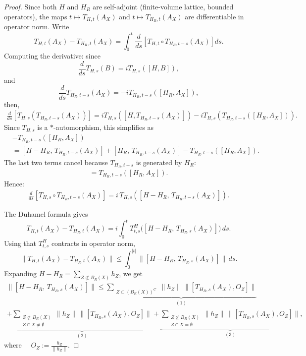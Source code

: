 \documentclass[11pt]{article}
\numberwithin{equation}{section}
\numberwithin{figure}{section}
\numberwithin{table}{section}
\theoremstyle{definition}
\theoremstyle{plain}
\theoremstyle{remark}
\newcommand{\Z}{\mathbb{Z}}
\newcommand{\summ}[1]{\sum\limits_{\substack{ #1 }}}
\begin{document}
\begin{proof}
Since both $H$ and $H_R$ are self-adjoint (finite-volume lattice, bounded operators), the maps $t\mapsto T_{H,t}(A_X)$ and $t\mapsto T_{H_R,t}(A_X)$ are differentiable in operator norm. Write
\[
T_{H,t}(A_X)-T_{H_R,t}(A_X)=\int_0^t \dfrac{d}{ds}\left [ T_{H,t}\circ T_{H_R,t-s}(A_X)\right ]ds.
\]
Computing the derivative: since \[\frac{d}{ds}T_{H,s}(B) = iT_{H,s}([H,B]),\] and
\[\frac{d}{ds}T_{H_R,t-s}(A_X) = -iT_{H_R,t-s}([H_R, A_X]),\]then,
\begin{align}
\frac{d}{ds}\left[T_{H,s}\!\left(T_{H_R,t-s}(A_X)\right)\right]
= iT_{H,s}\!\left([H,T_{H_R,t-s}(A_X)]\right)
- iT_{H,s}\!\left(T_{H_R,t-s}([H_R, A_X])\right).
\end{align}
Since $T_{H,s}$ is a $*$-automorphism, this simplifies as
\begin{align*}
[H,T_{H_R,t-s}(A_X)] &- T_{H_R,t-s}([H_R,A_X])\\
&= [H - H_R,\, T_{H_R,t-s}(A_X)]
+ [H_R,\, T_{H_R,t-s}(A_X)]
- T_{H_R,t-s}([H_R, A_X]).
\end{align*}
The last two terms cancel because $T_{H_R,t-s}$ is generated by $H_R$:
\begin{align}
[H_R,\, T_{H_R,t-s}(A_X)] = T_{H_R,t-s}([H_R, A_X]).
\end{align}
Hence:
\begin{align}
\frac{d}{ds}\left[T_{H,s} \circ T_{H_R,t-s}(A_X)\right]
= i\,T_{H,s}\!\left([H - H_R,\, T_{H_R,t-s}(A_X)]\right).
\end{align}

The Duhamel formula gives
\begin{equation}
T_{H,t}(A_X)-T_{H_R,t}(A_X)
= i\int_0^{t} T_{t,s}^{H}\!\big([H-H_R,\,T_{H_R,s}(A_X)]\big)\,ds.
\end{equation}
Using that $T_{t,s}^H$ contracts in operator norm,
\begin{equation}
\big\|T_{H,t}(A_X)-T_{H_R,t}(A_X)\big\|
\le \int_0^{|t|}\!\big\|[H-H_R,\,T_{H_R,s}(A_X)]\big\|\,ds.
\label{eq:duhamel}
\end{equation}
Expanding $H-H_R=\sum_{Z\not\subset B_R(X)} h_Z$, we get
\begin{multline}
\big\|[H-H_R,\,T_{H_R,s}(A_X)]\big\|
\le \underbrace{\summ{Z\subset (B_R(X))^C } \|h_Z\|\,
\big\|[T_{H_R,s}(A_X), O_Z]\big\|}_{(1)} \\
+\underbrace{\summ{Z\not\subset B_R(X)\\Z\cap X \neq \emptyset} \|h_Z\|\,
\big\|[T_{H_R,s}(A_X), O_Z]\big\|}_{(2)}
+\underbrace{\summ{Z\not\subset B_R(X)\\Z\cap X = \emptyset} \|h_Z\|\,
\big\|[T_{H_R,s}(A_X), O_Z]\big\|}_{(3)},
\end{multline}
where $\quad O_Z := \frac{h_Z}{\|h_Z\|}.$


\end{proof}
\end{document}
